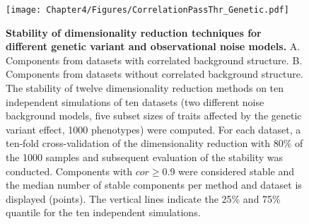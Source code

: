 \begin{figure}[hbtp]
	\centering
	\texttt{[image: Chapter4/Figures/CorrelationPassThr\_Genetic.pdf]}
\caption[\textbf{Stability of dimensionality reduction techniques for different genetic variant and  observational noise models.}]{\textbf{Stability of dimensionality reduction techniques for different genetic variant and observational noise models. }A. Components from datasets with correlated background structure. B. Components from datasets without correlated background structure. The stability of twelve dimensionality reduction methods on ten independent simulations of ten datasets (two different noise background models, five subset sizes of traits affected by the genetic variant effect, \num{1000} phenotypes) were computed.  For each dataset, a ten-fold cross-validation of the dimensionality reduction with \num{80}\% of the \num{1000} samples and subsequent evaluation of the stability was conducted. Components with \(cor \ge 0.9\) were considered stable and the median number of stable components per method and dataset is displayed (points). The vertical lines indicate the \num{25}\% and \num{75}\% quantile for the ten independent simulations. } 
	 	\label{fig:cor-genetic}
\end{figure}

